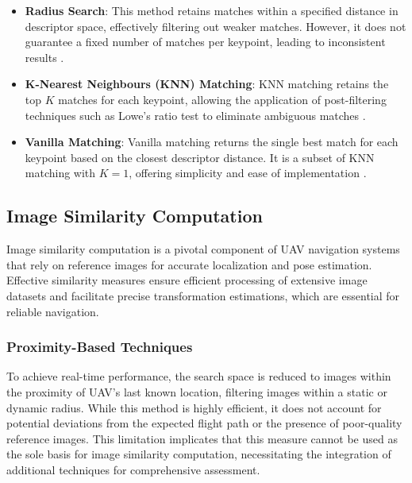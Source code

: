 \begin{itemize}
    \item \textbf{Radius Search}: This method retains matches within a specified distance in descriptor space, effectively filtering out weaker matches. However, it does not guarantee a fixed number of matches per keypoint, leading to inconsistent results \cite{opencv_matcher_tutorial}. 
    
    \item \textbf{K-Nearest Neighbours (KNN) Matching}: KNN matching retains the top \( K \) matches for each keypoint, allowing the application of post-filtering techniques such as Lowe’s ratio test to eliminate ambiguous matches \cite{opencv_matcher_tutorial}.
    
    \item \textbf{Vanilla Matching}: Vanilla matching returns the single best match for each keypoint based on the closest descriptor distance. It is a subset of KNN matching with \( K=1 \), offering simplicity and ease of implementation \cite{opencv_matcher_tutorial}. 
    

\end{itemize}







\subsection{Image Similarity Computation}

Image similarity computation is a pivotal component of UAV navigation systems that rely on reference images for accurate localization and pose estimation. Effective similarity measures ensure efficient processing of extensive image datasets and facilitate precise transformation estimations, which are essential for reliable navigation.

\subsubsection{Proximity-Based Techniques}

To achieve real-time performance, the search space is reduced to images within the proximity of UAV's last known location, filtering images within a static or dynamic radius. While this method is highly efficient, it does not account for potential deviations from the expected flight path or the presence of poor-quality reference images. This limitation implicates that this measure cannot be used as the sole basis for image similarity computation, necessitating the integration of additional techniques for comprehensive assessment.

